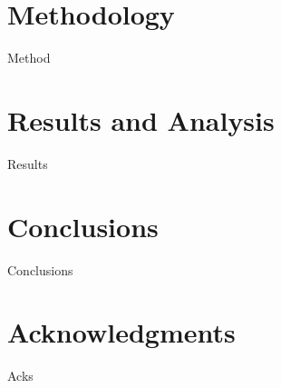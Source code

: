 \documentclass{anstrans}
\begin{document}
\section{Methodology}
Method

\section{Results and Analysis}
Results

\section{Conclusions}
Conclusions

\section{Acknowledgments}
Acks



\end{document}
